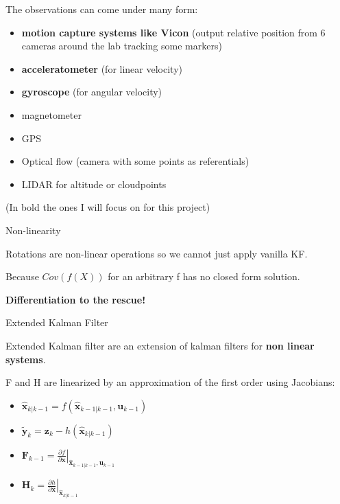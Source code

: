 \begin{frame}{}

The observations can come under many form:

\begin{itemize}
\tightlist
\item
  \textbf{motion capture systems like Vicon} (output relative position
  from 6 cameras around the lab tracking some markers)
\item
  \textbf{acceleratometer} (for linear velocity)
\item
  \textbf{gyroscope} (for angular velocity)
\item
  magnetometer
\item
  GPS
\item
  Optical flow (camera with some points as referentials)
\item
  LIDAR for altitude or cloudpoints
\end{itemize}

(In bold the ones I will focus on for this project)

\end{frame}

\begin{frame}{Non-linearity}

Rotations are non-linear operations so we cannot just apply vanilla KF.

Because \(Cov(f(X))\) for an arbitrary f has no closed form solution.

\textbf{Differentiation to the rescue!}

\end{frame}

\begin{frame}{Extended Kalman Filter}

Extended Kalman filter are an extension of kalman filters for
\textbf{non linear systems}.

F and H are linearized by an approximation of the first order using
Jacobians:

\begin{itemize}
\tightlist
\item
  \(\hat{\boldsymbol{x}}_{k|k-1} = f(\hat{\boldsymbol{x}}_{k-1|k-1}, \boldsymbol{u}_{k-1})\)
\item
  \(\tilde{\boldsymbol{y}}_{k} = \boldsymbol{z}_{k} - h(\hat{\boldsymbol{x}}_{k|k-1})\)
\item
  \({{\boldsymbol{F}_{k-1}}} = \left . \frac{\partial f}{\partial \boldsymbol{x} } \right \vert _{\hat{\boldsymbol{x}}_{k-1|k-1},\boldsymbol{u}_{k-1}}\)
\item
  \({{\boldsymbol{H}_{k}}} = \left . \frac{\partial h}{\partial \boldsymbol{x} } \right \vert _{\hat{\boldsymbol{x}}_{k|k-1}}\)
\end{itemize}

\end{frame}

